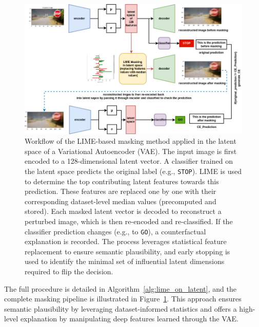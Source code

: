 \begin{figure}[h]
    \centering
    \includegraphics[width=0.95\linewidth]{img//masking/lime_on_latent/LIME_on_latent_space_masking.png}
    \caption{Workflow of the LIME-based masking method applied in the latent space of a Variational Autoencoder (VAE). 
    The input image is first encoded to a 128-dimensional latent vector. A classifier trained on the latent space predicts the original label (e.g., \texttt{STOP}). 
    LIME is used to determine the top contributing latent features towards this prediction. These features are replaced one by one with their corresponding dataset-level median values (precomputed and stored). 
    Each masked latent vector is decoded to reconstruct a perturbed image, which is then re-encoded and re-classified. 
    If the classifier prediction changes (e.g., to \texttt{GO}), a counterfactual explanation is recorded. 
    The process leverages statistical feature replacement to ensure semantic plausibility, and early stopping is used to identify the minimal set of influential latent dimensions required to flip the decision.
    }
    \label{fig:lime_latent_workflow}
\end{figure}

The full procedure is detailed in Algorithm~\ref{alg:lime_on_latent}, and the complete masking pipeline is illustrated in Figure~\ref{fig:lime_latent_workflow}. This approach ensures semantic plausibility by leveraging dataset-informed statistics and offers a high-level explanation by manipulating deep features learned through the VAE.


